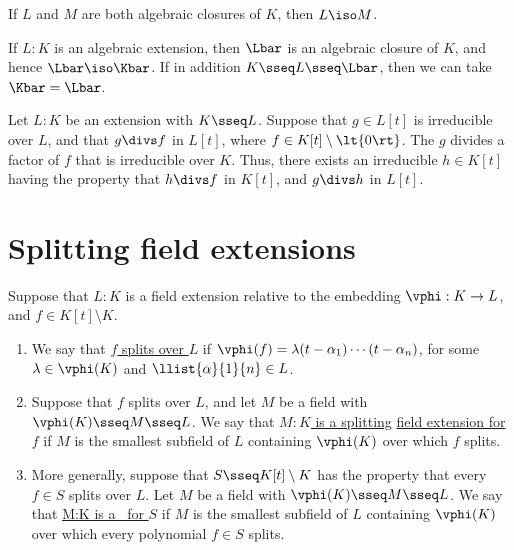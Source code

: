 \documentclass{article}
\begin{document}
  \begin{tproposition}
    If \( L \) and \( M \) are both algebraic closures of \( K \), then \( L \iso M \).
  \end{tproposition}

  \begin{tproposition}
    If \( L:K \) is an algebraic extension, then \( \Lbar \) is an algebraic closure of \( K \), and hence \( \Lbar\iso\Kbar \).
    If in addition \( K\sseq L\sseq \Lbar \), then we can take \( \Kbar = \Lbar \).
  \end{tproposition}

  \begin{tproposition}
    Let \( L:K \) be an extension with \( K\sseq L \).
    Suppose that \( g\in L[t] \) is irreducible over \( L \), and that \( g\divs f \) in \( L[t] \), where \( f\in K[t]\setminus \lt\{ 0 \rt\} \).
    The \( g \) divides a factor of \( f \) that is irreducible over \( K \).
    Thus, there exists an irreducible \( h\in K[t] \) having the property that \( h\divs f \) in \( K[t] \), and \( g\divs h \) in \( L[t] \).
  \end{tproposition}

\section{Splitting field extensions}
  \begin{tdefinition}
    Suppose that \( L:K \) is a field extension relative to the embedding \( \vphi : K\to L \), and \( f\in K[t]\setminus K \).
    \begin{enumerate}[label=(\roman*)]
      \item We say that \ul{\( f \) splits over \( L \)} if \( \vphi(f)=\lambda(t-\alpha_1)\cdots(t-\alpha_n) \), for some \( \lambda\in \vphi(K) \) and \( \llist{\alpha}{1}{n}\in L \).
      \item Suppose that \( f \) splits over \( L \), and let \( M \) be a field with \( \vphi(K)\sseq M\sseq L \).
        We say that \ul{\( M:K \) is a splitting} \ul{field extension for \( f \)} if \( M \) is the smallest subfield of \( L \) containing \( \vphi(K) \) over which \( f \) splits.
      \item More generally, suppose that \( S\sseq K[t]\setminus K \) has the property that every \( f\in S \) splits over \( L \).
        Let \( M \) be a field with \( \vphi(K)\sseq M\sseq L \).
        We say that \ul{M:K is a \sfe~for \( S \)} if \( M \) is the smallest subfield of \( L \) containing \( \vphi(K) \) over which every polynomial \( f\in S \) splits.
    \end{enumerate}
  \end{tdefinition}
\end{document}
